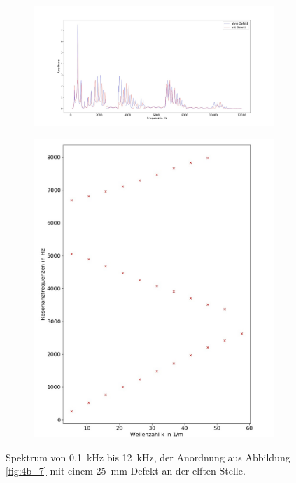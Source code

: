 \begin{figure}
\centering
\begin{subfigure}{0.65\textwidth}
\includegraphics[width=\textwidth]{content/Scripts/defect5.jpg}
\end{subfigure}
\begin{subfigure}{0.34\textwidth}
\includegraphics[width=\textwidth]{content/Scripts/4b_7_2b.jpg}
\end{subfigure}
\caption{Spektrum von 0.1~kHz bis 12~kHz, der Anordnung aus Abbildung \ref{fig:4b_7} mit einem 25~mm Defekt an der elften Stelle.}
\label{fig:4b_7_2b}
\end{figure}

